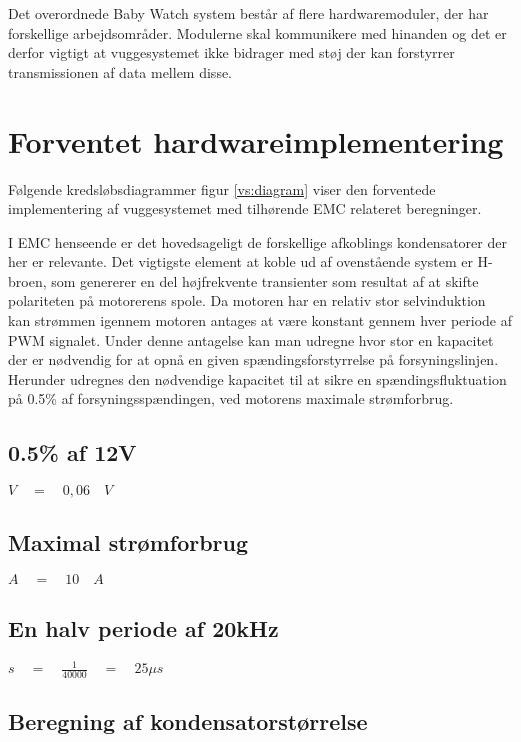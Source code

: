 Det overordnede Baby Watch system består af flere hardwaremoduler, der har forskellige arbejdsområder. Modulerne skal kommunikere med hinanden og det er derfor vigtigt at vuggesystemet ikke bidrager med støj der kan forstyrrer transmissionen af data mellem disse.

\section{Forventet hardwareimplementering}

Følgende kredsløbsdiagrammer figur \ref{vs:diagram} viser den forventede implementering af vuggesystemet med tilhørende EMC relateret beregninger.


I EMC henseende er det hovedsageligt de forskellige afkoblings kondensatorer der her er relevante. 
Det vigtigste element at koble ud af ovenstående system er H-broen, som genererer en del højfrekvente transienter som resultat af at skifte polariteten på motorerens spole. 
Da motoren har en relativ stor selvinduktion kan strømmen igennem motoren antages at være konstant gennem hver periode af PWM signalet. Under denne antagelse kan man udregne hvor stor en kapacitet der er nødvendig for at opnå en given spændingsforstyrrelse på forsyningslinjen. Herunder udregnes den nødvendige kapacitet til at sikre en spændingsfluktuation på 0.5\% af forsyningsspændingen, ved motorens maximale strømforbrug.

\subsection*{0.5\% af 12V}

$V\quad =\quad 0,06\quad V$

\subsection*{Maximal strømforbrug}

$A\quad =\quad 10\quad A$

\subsection*{En halv periode af 20kHz}

$s\quad =\quad \frac { 1 }{ 40000 } \quad =\quad 25\mu s$

\subsection*{Beregning af kondensatorstørrelse}

